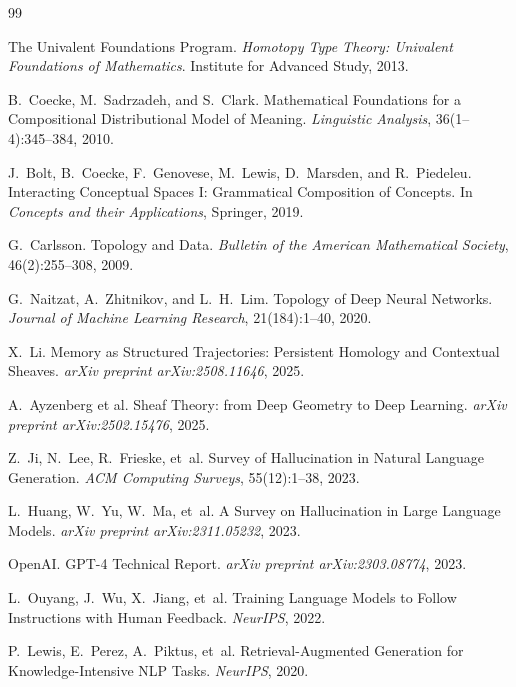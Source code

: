 \documentclass[11pt,a4paper]{article}
\theoremstyle{plain}
\theoremstyle{definition}
\begin{document}
\begin{thebibliography}{99}

The Univalent Foundations Program.
\textit{Homotopy Type Theory: Univalent Foundations of Mathematics}.
Institute for Advanced Study, 2013.

B.~Coecke, M.~Sadrzadeh, and S.~Clark.
Mathematical Foundations for a Compositional Distributional Model of Meaning.
\textit{Linguistic Analysis}, 36(1--4):345--384, 2010.

J.~Bolt, B.~Coecke, F.~Genovese, M.~Lewis, D.~Marsden, and R.~Piedeleu.
Interacting Conceptual Spaces I: Grammatical Composition of Concepts.
In \textit{Concepts and their Applications}, Springer, 2019.

G.~Carlsson.
Topology and Data.
\textit{Bulletin of the American Mathematical Society}, 46(2):255--308, 2009.

G.~Naitzat, A.~Zhitnikov, and L.~H.~Lim.
Topology of Deep Neural Networks.
\textit{Journal of Machine Learning Research}, 21(184):1--40, 2020.

X.~Li.
Memory as Structured Trajectories: Persistent Homology and Contextual Sheaves.
\textit{arXiv preprint arXiv:2508.11646}, 2025.

A.~Ayzenberg et al.
Sheaf Theory: from Deep Geometry to Deep Learning.
\textit{arXiv preprint arXiv:2502.15476}, 2025.

Z.~Ji, N.~Lee, R.~Frieske, et~al.
Survey of Hallucination in Natural Language Generation.
\textit{ACM Computing Surveys}, 55(12):1--38, 2023.

L.~Huang, W.~Yu, W.~Ma, et~al.
A Survey on Hallucination in Large Language Models.
\textit{arXiv preprint arXiv:2311.05232}, 2023.

OpenAI.
GPT-4 Technical Report.
\textit{arXiv preprint arXiv:2303.08774}, 2023.

L.~Ouyang, J.~Wu, X.~Jiang, et~al.
Training Language Models to Follow Instructions with Human Feedback.
\textit{NeurIPS}, 2022.

P.~Lewis, E.~Perez, A.~Piktus, et~al.
Retrieval-Augmented Generation for Knowledge-Intensive NLP Tasks.
\textit{NeurIPS}, 2020.


\end{thebibliography}
\end{document}

